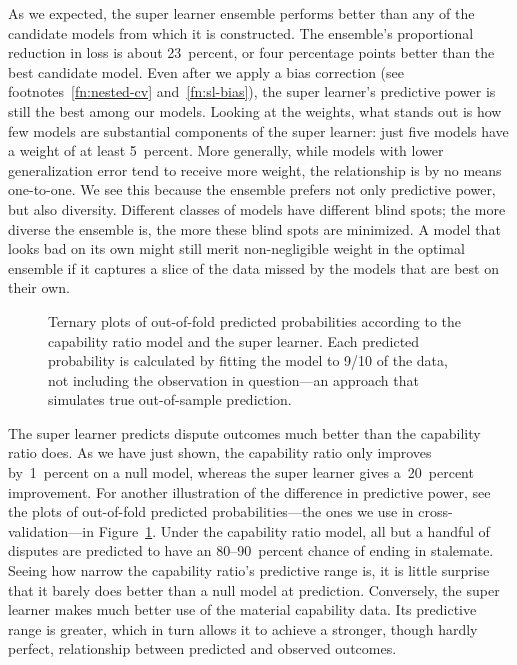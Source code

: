 As we expected, the super learner ensemble performs better than any of the candidate models from which it is constructed.
The ensemble's proportional reduction in loss is about 23~percent, or four percentage points better than the best candidate model.
Even after we apply a bias correction (see footnotes~\ref{fn:nested-cv} and~\ref{fn:sl-bias}), the super learner's predictive power is still the best among our models.
Looking at the weights, what stands out is how few models are substantial components of the super learner: just five models have a weight of at least 5~percent.
More generally, while models with lower generalization error tend to receive more weight, the relationship is by no means one-to-one.
We see this because the ensemble prefers not only predictive power, but also diversity.
Different classes of models have different blind spots; the more diverse the ensemble is, the more these blind spots are minimized.
A model that looks bad on its own might still merit non-negligible weight in the optimal ensemble if it captures a slice of the data missed by the models that are best on their own.

\begin{figure}[tp]
  \centering
  
  \vspace{-2em}
  \caption{
    Ternary plots of out-of-fold predicted probabilities according to the capability ratio model and the super learner.
    Each predicted probability is calculated by fitting the model to 9/10 of the data, not including the observation in question---an approach that simulates true out-of-sample prediction.
  }
  \label{fig:oof-pred}
\end{figure}

The super learner predicts dispute outcomes much better than the capability ratio does.
As we have just shown, the capability ratio only improves by~1~percent on a null model, whereas the super learner gives a~20~percent improvement.
For another illustration of the difference in predictive power, see the plots of out-of-fold predicted probabilities---the ones we use in cross-validation---in Figure~\ref{fig:oof-pred}.
Under the capability ratio model, all but a handful of disputes are predicted to have an 80--90~percent chance of ending in stalemate.
Seeing how narrow the capability ratio's predictive range is, it is little surprise that it barely does better than a null model at prediction.
Conversely, the super learner makes much better use of the material capability data.
Its predictive range is greater, which in turn allows it to achieve a stronger, though hardly perfect, relationship between predicted and observed outcomes.

